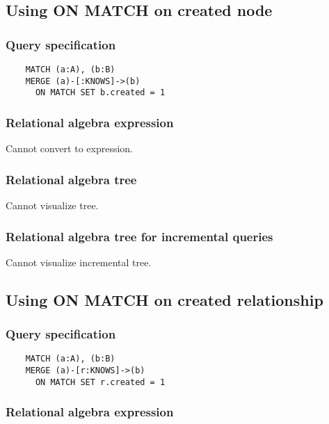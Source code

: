 	\subsection{Using ON MATCH on created node}

	\subsubsection*{Query specification}

	\begin{lstlisting}
	MATCH (a:A), (b:B)
	MERGE (a)-[:KNOWS]->(b)
	  ON MATCH SET b.created = 1
	\end{lstlisting}


	\subsubsection*{Relational algebra expression}

	Cannot convert to expression.

	\subsubsection*{Relational algebra tree}

	Cannot visualize tree.

	\subsubsection*{Relational algebra tree for incremental queries}

	Cannot visualize incremental tree.
	\subsection{Using ON MATCH on created relationship}

	\subsubsection*{Query specification}

	\begin{lstlisting}
	MATCH (a:A), (b:B)
	MERGE (a)-[r:KNOWS]->(b)
	  ON MATCH SET r.created = 1
	\end{lstlisting}


	\subsubsection*{Relational algebra expression}

